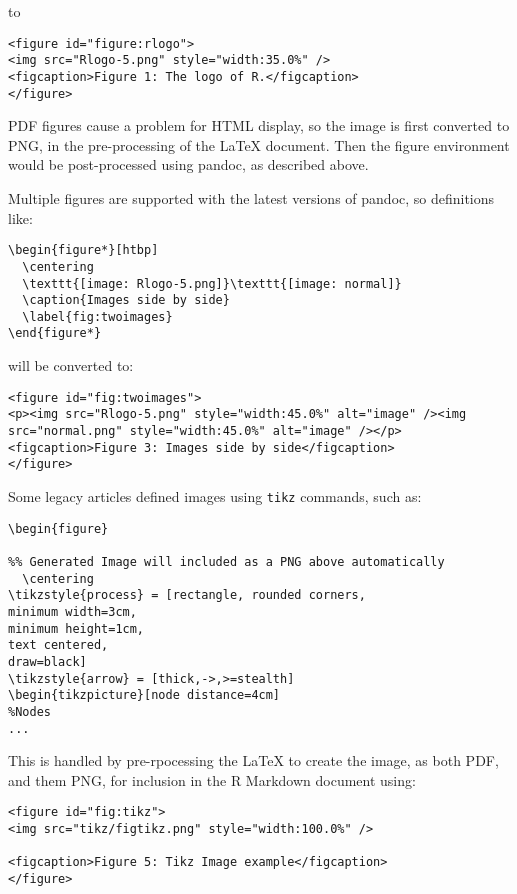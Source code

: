 to

\begin{verbatim}
<figure id="figure:rlogo">
<img src="Rlogo-5.png" style="width:35.0%" />
<figcaption>Figure 1: The logo of R.</figcaption>
</figure>
\end{verbatim}

PDF figures cause a problem for HTML display, so the image is first converted to PNG, in the pre-processing of the LaTeX document. Then the figure environment would be post-processed using pandoc, as described above.

Multiple figures are supported with the latest versions of pandoc, so definitions like:

\begin{verbatim}
\begin{figure*}[htbp]
  \centering
  \texttt{[image: Rlogo-5.png]}\texttt{[image: normal]}
  \caption{Images side by side}
  \label{fig:twoimages}
\end{figure*}
\end{verbatim}

will be converted to:

\begin{verbatim}
<figure id="fig:twoimages">
<p><img src="Rlogo-5.png" style="width:45.0%" alt="image" /><img
src="normal.png" style="width:45.0%" alt="image" /></p>
<figcaption>Figure 3: Images side by side</figcaption>
</figure>
\end{verbatim}

Some legacy articles defined images using \texttt{tikz} commands, such as:

\begin{verbatim}
\begin{figure}

%% Generated Image will included as a PNG above automatically
  \centering
\tikzstyle{process} = [rectangle, rounded corners,
minimum width=3cm, 
minimum height=1cm,
text centered, 
draw=black]
\tikzstyle{arrow} = [thick,->,>=stealth]
\begin{tikzpicture}[node distance=4cm]
%Nodes
...
\end{verbatim}

This is handled by pre-rpocessing the LaTeX to create the image, as both PDF, and them PNG, for inclusion in the R Markdown document using:

\begin{verbatim}
<figure id="fig:tikz">
<img src="tikz/figtikz.png" style="width:100.0%" />

<figcaption>Figure 5: Tikz Image example</figcaption>
</figure>
\end{verbatim}

